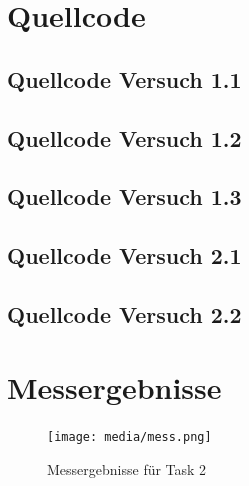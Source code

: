 \documentclass[12pt, oneside, a4paper, \docLanguage]{report}
\begin{document}
\section{Quellcode}
\label{chap:APPENDIX_SOURCECODE}

\subsection{Quellcode Versuch 1.1}
\label{chap:APPENDIX_SOURCECODE_V1.1}

\newpage
\subsection{Quellcode Versuch 1.2}
\label{chap:APPENDIX_SOURCECODE_V1.2}

\subsection{Quellcode Versuch 1.3}
\label{chap:APPENDIX_SOURCECODE_V1.3}

\newpage
\subsection{Quellcode Versuch 2.1}
\label{chap:APPENDIX_SOURCECODE_V2.1}

\newpage
\subsection{Quellcode Versuch 2.2}
\label{chap:APPENDIX_SOURCECODE_V2.2}

\newpage
\section{Messergebnisse}
\label{chap:APPENDIX_MEASUREMENT_SOURCE}
\begin{figure}[H]
	\centering\small
	\texttt{[image: media/mess.png]}
	\caption{Messergebnisse für Task 2}
	\label{img:Messergebnisse für Task 2}
\end{figure}
%
%

\end{document}
